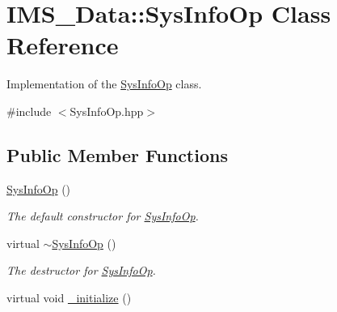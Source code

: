 \hypertarget{classIMS__Data_1_1SysInfoOp}{
\section{IMS\_\-Data::SysInfoOp Class Reference}
\label{classIMS__Data_1_1SysInfoOp}
}


Implementation of the \hyperlink{classIMS__Data_1_1SysInfoOp}{SysInfoOp} class.  




{\ttfamily \#include $<$SysInfoOp.hpp$>$}

\subsection*{Public Member Functions}
\begin{DoxyCompactItemize}
\item 
\hypertarget{classIMS__Data_1_1SysInfoOp_afd800a339ebac62d89090f2e216174de}{
\hyperlink{classIMS__Data_1_1SysInfoOp_afd800a339ebac62d89090f2e216174de}{SysInfoOp} ()}
\label{classIMS__Data_1_1SysInfoOp_afd800a339ebac62d89090f2e216174de}

\begin{DoxyCompactList}\small\item\em The default constructor for \hyperlink{classIMS__Data_1_1SysInfoOp}{SysInfoOp}. \item\end{DoxyCompactList}\item 
\hypertarget{classIMS__Data_1_1SysInfoOp_a00b845ad43ddd273413cc25d7a52be1b}{
virtual \hyperlink{classIMS__Data_1_1SysInfoOp_a00b845ad43ddd273413cc25d7a52be1b}{$\sim$SysInfoOp} ()}
\label{classIMS__Data_1_1SysInfoOp_a00b845ad43ddd273413cc25d7a52be1b}

\begin{DoxyCompactList}\small\item\em The destructor for \hyperlink{classIMS__Data_1_1SysInfoOp}{SysInfoOp}. \item\end{DoxyCompactList}\item 
\hypertarget{classIMS__Data_1_1SysInfoOp_ab3f66f1899838b74e87939cb0b192367}{
virtual void \hyperlink{classIMS__Data_1_1SysInfoOp_ab3f66f1899838b74e87939cb0b192367}{\_\-initialize} ()}
\label{classIMS__Data_1_1SysInfoOp_ab3f66f1899838b74e87939cb0b192367}


\end{DoxyCompactItemize}
